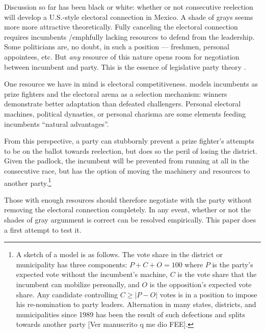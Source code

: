 \documentclass[letter,12pt]{article}
\begin{document}

Discussion so far has been black or white: whether or not consecutive reelection will develop a U.S.-style electoral connection in Mexico. A shade of grays seems more more attractive theoretically. Fully canceling the electoral connection requires incumbents /emph{fully} lacking resources to defend from the leadership. Some politicians are, no doubt, in such a position --- freshmen, personal appointees, etc. But \emph{any} resource of this nature opens room for negotiation between incumbent and party. This is the essence of legislative party theory \citep{cox.mccubbins.1993,aldrich.rohdeCPG2001}.

One resource we have in mind is electoral competitiveness. \citet{zallerprizeFighters} models incumbents as prize fighters and the electoral arena as a selection mechanism: winners demonstrate better adaptation than defeated challengers. Personal electoral machines, political dynasties, or personal charisma are some elements feeding incumbents ``natural advantages''. 

From this perspective, a party can stubbornly prevent a prize fighter's attempts to be on the ballot towards reelection, but does so the peril of losing the district. Given the padlock, the incumbent will be prevented from running at all in the consecutive race, but has the option of moving the machinery and resources to another party.\footnote{A sketch of a model is as follows. The vote share in the district or municipality has three components: $P + C + O = 100$ where $P$ is the party's expected vote without the incumbent's machine, $C$ is the vote share that the incumbent can mobilize personally, and $O$ is the opposition's expected vote share. Any candidate controlling $C \ge |P-O|$ votes is in a position to impose his re-nomination to party leaders. Alternation in many states, districts, and municipalities since 1989 has been the result of such defections and splits towards another party [Ver manuscrito q me dio FEE].}

Those with enough resources should therefore negotiate with the party without removing the electoral connection completely. In any event, whether or not the shades of gray argunment is correct can be resolved empirically. This paper does a first attempt to test it. 
\end{document}
